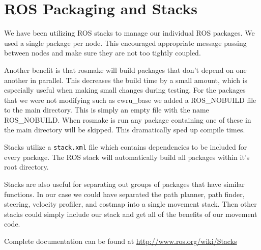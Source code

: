 \section{ROS Packaging and Stacks}

We have been utilizing ROS stacks to manage our individual ROS packages.
We used a single package per node. This encouraged
appropriate message passing between nodes and make sure they are not too
tightly coupled.

Another benefit is that rosmake will build packages that don't depend
on one another in parallel.  This decreases the build time by a small
amount, which is especially useful when making small changes during testing. For the packages that we were not modifying such as cwru\_base we added a ROS\_NOBUILD file to the main directory. This is simply an empty file with the name ROS\_NOBUILD. When rosmake is run any package containing one of these in the main directory will be skipped.  This dramatically sped up compile times.

Stacks utilize a \texttt{stack.xml} file which contains dependencies to
be included for every package. The ROS stack will automatically build
all packages within it's root directory.

Stacks are also useful for separating out groups of packages that have similar functions.  In our case we could have separated the path planner, path finder, steering, velocity profiler, and costmap into a single movement stack. Then other stacks could simply include our stack and get all of the benefits of our movement code.

Complete documentation can be found at 
\url{http://www.ros.org/wiki/Stacks}
